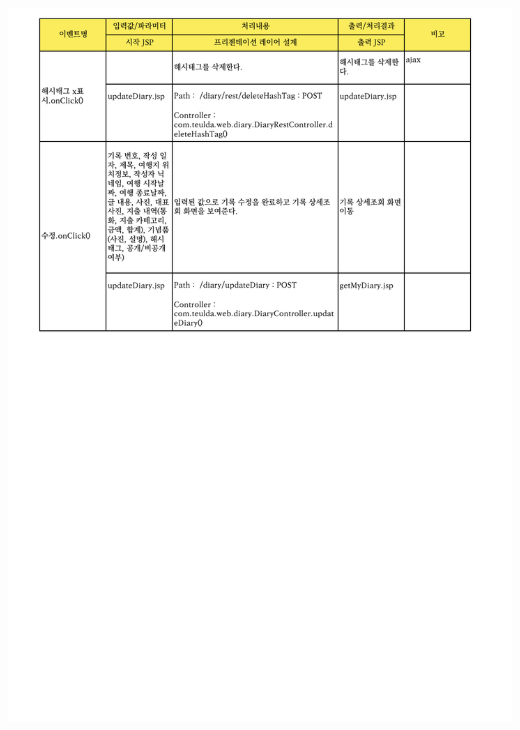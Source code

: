 {{{{{{{{{{{{{{{{{{{{{{{{{{{{{{\includegraphics[width=20cm]{./Figure/Design/Display/diary/diary_12.pdf} \\
}}}}}}}}}}}}}}}}}}}}}}}}}}}}}}
